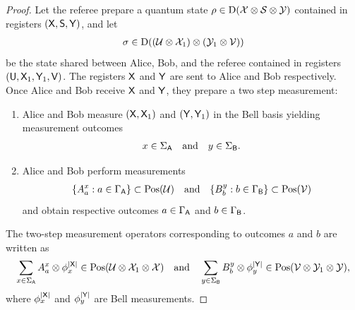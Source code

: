 \begin{proof}
Let the referee prepare a quantum state $\rho \in \mathrm{D}(\mathcal{X} \otimes \mathcal{S} \otimes \mathcal{Y})$ contained in registers $(\mathsf{X},\mathsf{S},\mathsf{Y})$, and let 
\begin{align}
	\sigma \in \mathrm{D}( (\mathcal{U} \otimes \mathcal{X}_1) \otimes (\mathcal{Y}_1 \otimes \mathcal{V}) )
\end{align}
be the state shared between Alice, Bob, and the referee contained in registers $(\mathsf{U},\mathsf{X}_1,\mathsf{Y}_1,\mathsf{V})$. The registers $\mathsf{X}$ and $\mathsf{Y}$ are sent to Alice and Bob respectively. Once Alice and Bob receive $\mathsf{X}$ and $\mathsf{Y}$, they prepare a two step measurement:

\begin{enumerate}
	\item Alice and Bob measure $(\mathsf{X},\mathsf{X}_1)$ and $(\mathsf{Y},\mathsf{Y}_1)$ in the Bell basis yielding measurement outcomes 
		\begin{align}
			x \in \Sigma_{\mathsf{A}} \quad \textnormal{and} \quad y \in \Sigma_{\mathsf{B}}.
		\end{align}
	\item Alice and Bob perform measurements 
		\begin{align}
			\{ A_a^x : a \in \Gamma_{\mathsf{A}} \} \subset \mathrm{Pos}(\mathcal{U}) \quad \textnormal{and} \quad \{ B_b^y : b \in \Gamma_{\mathsf{B}} \} \subset \mathrm{Pos}(\mathcal{V})
		\end{align}
		and obtain respective outcomes $a \in \Gamma_{\mathsf{A}}$ and $b \in \Gamma_{\mathsf{B}}$. 
\end{enumerate}
The two-step measurement operators corresponding to outcomes $a$ and $b$ are written as 
\begin{align}
	\sum_{x \in \Sigma_{\mathsf{A}}} A_a^x \otimes \phi_x^{\left\lvert \mathsf{X} \right\rvert} \in \mathrm{Pos}(\mathcal{U} \otimes \mathcal{X}_1 \otimes \mathcal{X}) \quad \textnormal{and} \quad \sum_{y \in \Sigma_{\mathsf{B}}} B_b^y \otimes \phi_y^{\left\lvert \mathsf{Y} \right\rvert} \in \mathrm{Pos}(\mathcal{V} \otimes \mathcal{Y}_1 \otimes \mathcal{Y}),
\end{align}
where $\phi_x^{\left\lvert \mathsf{X} \right\rvert}$ and $\phi_y^{\left\lvert \mathsf{Y} \right\rvert}$ are Bell measurements. 

\end{proof}
